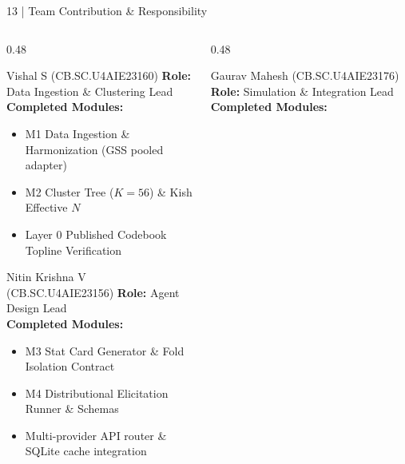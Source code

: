 \documentclass[10pt,aspectratio=169]{beamer}
\begin{document}
\begin{frame}{13 | Team Contribution \& Responsibility}
    \small
    \begin{columns}[T]
        \begin{column}{0.48\textwidth}
            \begin{block}{Vishal S (CB.SC.U4AIE23160)}
                \scriptsize
                \textbf{Role:} Data Ingestion \& Clustering Lead \\
                \textbf{Completed Modules:}
                \begin{itemize}\itemsep1pt
                    \item M1 Data Ingestion \& Harmonization (GSS pooled adapter)
                    \item M2 Cluster Tree ($K=56$) \& Kish Effective $N$
                    \item Layer 0 Published Codebook Topline Verification
                \end{itemize}
            \end{block}
            \vspace{0.1cm}
            \begin{block}{Nitin Krishna V (CB.SC.U4AIE23156)}
                \scriptsize
                \textbf{Role:} Agent Design Lead \\
                \textbf{Completed Modules:}
                \begin{itemize}\itemsep1pt
                    \item M3 Stat Card Generator \& Fold Isolation Contract
                    \item M4 Distributional Elicitation Runner \& Schemas
                    \item Multi-provider API router \& SQLite cache integration
                \end{itemize}
            \end{block}
        \end{column}
        \begin{column}{0.48\textwidth}
            \begin{block}{Gaurav Mahesh (CB.SC.U4AIE23176)}
                \scriptsize
                \textbf{Role:} Simulation \& Integration Lead \\
                \textbf{Completed Modules:}

\end{block}
\end{column}
\end{columns}
\end{frame}
\end{document}
